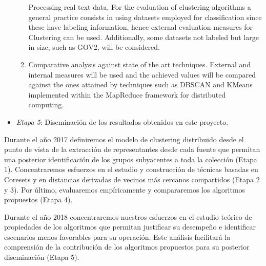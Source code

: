\documentclass[10pt]{article}
\begin{document}
\begin{itemize}
\begin{enumerate}
    Processing real text data. For the evaluation of clustering algorithms a general practice consists in using datasets employed for classification since these have labeling information, hence external evaluation measures for Clustering can be used. Additionally, some datasets not labeled but large in size, such as GOV2, will be considered. 
\item %
    Comparative analysis against state of the art techniques. External and internal measures will be used and the achieved values will be compared against the ones attained by techniques such as DBSCAN and KMeans implemented within the MapReduce framework for distributed computing. 

\end{enumerate}
\item \textit{Etapa 5}: Diseminación de los resultados obtenidos en este proyecto.%
\end{itemize}

Durante el a\~no 2017 definiremos el modelo de clustering distribuido desde el punto de vista de la extracción de representantes desde cada fuente que permitan una posterior identificación de los grupos subyacentes a toda la colección (Etapa 1). Concentraremos esfuerzos en el estudio y construcción de técnicas basadas en Coresets y en distancias derivadas de vecinos más cercanos compartidos (Etapa 2 y 3). Por último, evaluaremos empíricamente y compararemos los algoritmos propuestos (Etapa 4).


Durante el a\~no 2018 concentraremos nuestros esfuerzos en el estudio teórico de propiedades de los algoritmos que permitan justificar su desempeño e identificar escenarios menos favorables para su operación. Este análisis facilitará la comprensión de la contribución de los algoritmos propuestos para su posterior diseminación (Etapa 5).
\end{document}
